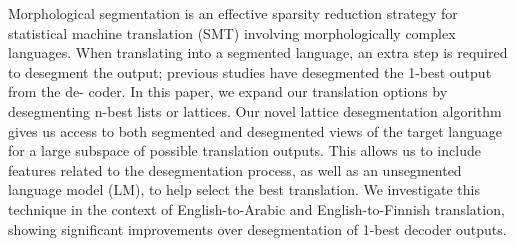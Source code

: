 Morphological segmentation is an effective sparsity reduction strategy for statistical machine translation (SMT) involving morphologically complex languages. When translating into a segmented language, an extra step is required to desegment the output; previous studies have desegmented the 1-best output from the de- coder. In this paper, we expand our translation options by desegmenting n-best lists or lattices. Our novel lattice desegmentation algorithm gives us access to both segmented and desegmented views of the target language for a large subspace of possible translation outputs. This allows us to include features related to the desegmentation process, as well as an unsegmented language model (LM), to help select the best translation. We investigate this technique in the context of English-to-Arabic and English-to-Finnish translation, showing significant improvements over desegmentation of 1-best decoder outputs.
